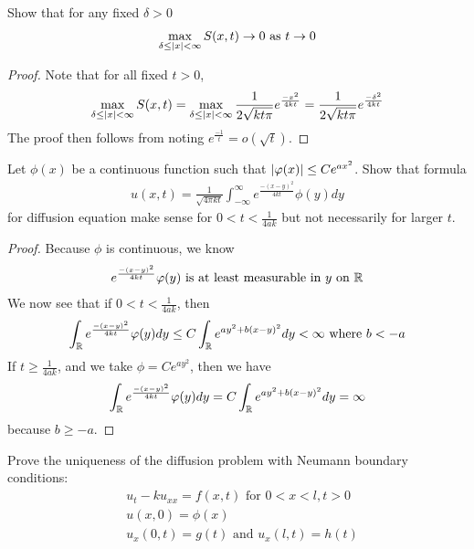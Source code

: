 \documentclass{report}
\begin{document}
\begin{question}{}{}
Show that for any fixed $\delta>0$ 
\begin{align*}
\max_{\delta \leq \left|x\right|<\infty}S(x,t)\to 0\text{ as }t \to 0
\end{align*}
\end{question}
\begin{proof}
Note that for all fixed $t>0$, 
 \begin{align*}
\max_{\delta \leq \left|x\right|<\infty } S(x,t)=\max_{\delta \leq \left|x\right|<\infty } \frac{1}{2\sqrt{kt \pi} } e^{\frac{-x^2}{4kt}}= \frac{1}{2\sqrt{kt \pi} } e^{\frac{-\delta^2}{4kt}} 
\end{align*}
The proof then follows from noting $e^{\frac{-1}{t}}=o(\sqrt{t})$. 
\end{proof}
\begin{question}{}{}
Let $\phi (x)$ be a continuous function such that  $\left|\varphi (x)\right|\leq Ce^{ax^2}$. Show that formula 
\begin{align*}
u(x,t)= \frac{1}{\sqrt{4 \pi kt} }\int_{-\infty}^{\infty} e^{\frac{-(x-y)^2}{4kt}}\phi (y)dy
\end{align*}
for diffusion equation make sense for $0<t<\frac{1}{4ak}$ but not necessarily for larger $t$. 
\end{question}
\begin{proof}
Because $\phi$ is continuous, we know  
\begin{align*}
e^{\frac{-(x-y)^2}{4kt}}\varphi (y)\text{ is at least measurable in $y$ on $\mathbb{R}$}
\end{align*}
We now see that if $0<t<\frac{1}{4ak}$, then 
\begin{align*}
\int_{\mathbb{R}} e^{\frac{-(x-y)^2}{4kt}}\varphi (y)dy\leq  C\int_{\mathbb{R}} e^{ay^2+b(x-y)^2}dy < \infty\text{ where }b<-a
\end{align*}
If $t\geq  \frac{1}{4ak}$, and we take $\phi = Ce^{ay^2}$, then we have 
\begin{align*}
\int_{\mathbb{R}} e^{\frac{-(x-y)^2}{4kt}}\varphi (y)dy= C\int_{\mathbb{R}} e^{ay^2+b(x-y)^2}dy =\infty
\end{align*}
because $b\geq -a$. 

\end{proof}
\begin{question}{}{}
Prove the uniqueness of the diffusion problem with Neumann boundary conditions:
\begin{align*}
&u_t-ku_{xx}=f(x,t)\text{ for }0<x<l,t>0 \\
&u(x,0)=\phi (x)\\
& u_x(0,t)=g(t) \text{ and }u_x(l,t)=h(t)
\end{align*}
\end{question}
\end{document}
